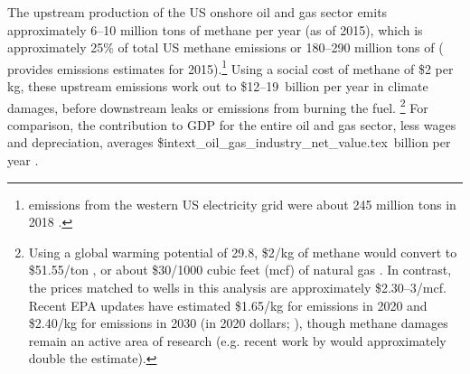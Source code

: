 The upstream production of the US onshore oil and gas sector emits approximately 6--10 million tons of methane per year (as of 2015), which is approximately
25\%
of total US methane emissions or 180--290 million tons of 
(\cite{Alvarez/etal:2018} provides emissions estimates for 2015).\footnote{%
 emissions from the western US electricity grid were about 245 million tons in 2018
\parencite{epa-egrid-2018}.
}
Using a social cost of methane of \$2 per kg, these upstream emissions work out to \$12--19~billion per year in climate damages, before downstream leaks or emissions from burning the fuel.%
\footnote{%
\label{fn:scghg}
Using a global warming potential of 29.8, \$2/kg of methane would convert to \$51.55/ton , or about \$30/1000 cubic feet (mcf) of natural gas \parencite{ipcc_ar6_methane_gwp}.
In contrast, the prices matched to wells in this analysis are approximately \$2.30--3/mcf.
Recent \gls{EPA} updates have estimated \$1.65/kg for emissions in 2020 and \$2.40/kg for emissions in 2030 (in 2020 dollars; \cite{EPASCC:2023}), though methane damages remain an active area of research
(e.g. recent work by \cite{McDuffie/etal:2023} would approximately double the estimate).
}
For comparison, the contribution to \gls{GDP} for the entire oil and gas sector, less wages and depreciation, averages
\${intext_oil_gas_industry_net_value.tex}~billion per year
\parencite{bea_output, bea_depreciation}.


